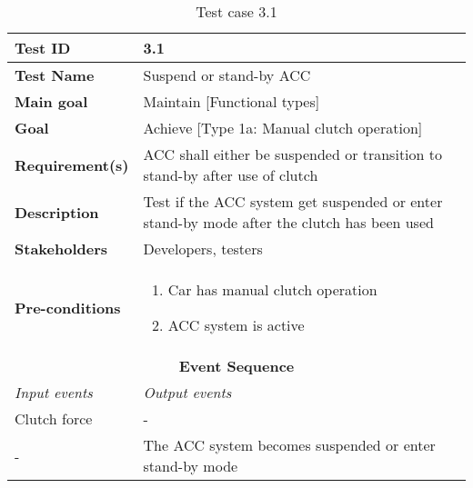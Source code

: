 \begin{table}[H]
\centering
\begin{tabularx}{\linewidth}{X|X}
  \hline
  \textbf{Test ID} & 3.1\\
  \hline
  \textbf{Test Name} &  Suspend or stand-by ACC\\
  \hline
  \textbf{Main goal} & Maintain [Functional types] \\
  \hline
  \textbf{Goal} & Achieve [Type 1a: Manual clutch operation] \\
  \hline
  \textbf{Requirement(s)} &  ACC shall either be suspended or transition to stand-by after use of clutch\\
  \hline
  \textbf{Description} &  Test if the ACC system get suspended or enter stand-by mode after the clutch has been used\\
  \hline
  \textbf{Stakeholders} &  Developers, testers\\
  \hline
  \textbf{Pre-conditions} &  
  \begin{enumerate}
      \item Car has manual clutch operation
      \item ACC system is active
  \end{enumerate}\\
  \hline
  \multicolumn{2}{c}{\textbf{Event Sequence}} \\
  \hline
  \textit{Input events} & \textit{Output events} \\
  \hline
   Clutch force & - \\
  \hline
   - & The ACC system becomes suspended or enter stand-by mode \\
  \hline
  \end{tabularx}
\caption{\label{tab_caseX} Test case 3.1}
\end{table}

